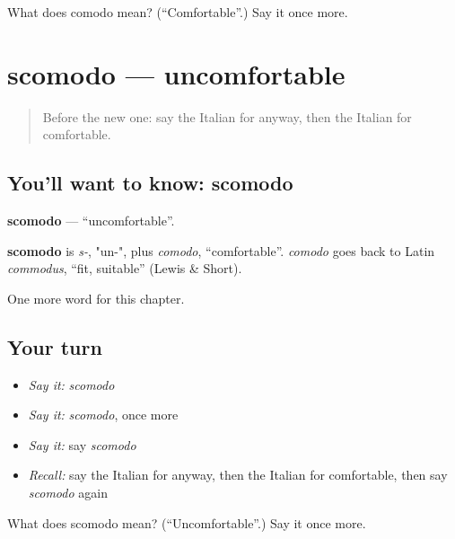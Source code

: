\begin{tcolorbox}[breakable,colback=teal!4,colframe=teal!35!black,title={Before you move on}]
What does comodo mean? (\textquotedblleft{}Comfortable\textquotedblright{}.) Say it once more.
\end{tcolorbox}
\section[scomodo]{scomodo — uncomfortable}

\label{lesson:IT-C156-scomodo}



\begin{quote}
Before the new one: say the Italian for anyway, then the Italian for comfortable.
\end{quote}

\subsection*{You'll want to know: scomodo}
\textbf{scomodo} — \textquotedblleft{}uncomfortable\textquotedblright{}.

\begin{cousinweb}
\textbf{scomodo} is \emph{s-}, "un-", plus \emph{comodo}, \textquotedblleft{}comfortable\textquotedblright{}. \emph{comodo} goes back to Latin \emph{commodus}, \textquotedblleft{}fit, suitable\textquotedblright{} (Lewis \& Short).
\end{cousinweb}

\begin{grammarlens}[title={What you've built}]
One more word for this chapter.
\end{grammarlens}

\subsection*{Your turn}
\begin{itemize}
\raggedright
  \item \emph{Say it:} \emph{scomodo}
  \item \emph{Say it:} \emph{scomodo}, once more
  \item \emph{Say it:} say \emph{scomodo}
  \item \emph{Recall:} say the Italian for anyway, then the Italian for comfortable, then say \emph{scomodo} again
\end{itemize}

\begin{tcolorbox}[breakable,colback=teal!4,colframe=teal!35!black,title={Before you move on}]
What does scomodo mean? (\textquotedblleft{}Uncomfortable\textquotedblright{}.) Say it once more.
\end{tcolorbox}
